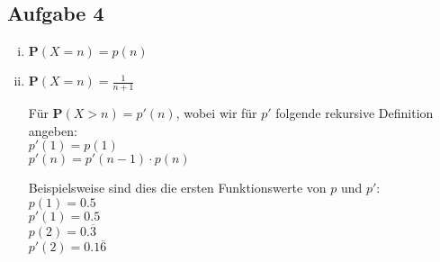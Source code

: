 \documentclass[10pt,a4paper,parskip=half]{scrartcl}
\begin{document}
\subsection*{Aufgabe 4}
\begin{enumerate}[(i)]
\item
$\mathbf P(X = n) = p(n)$
\item
$\mathbf P(X = n) = \frac 1 {n+1}$

Für $\mathbf P(X>n) = p'(n)$, wobei wir für $p'$ folgende rekursive Definition angeben:\\
$p'(1) = p(1)$\\
$p'(n) = p'(n-1) \cdot p(n)$

Beispielsweise sind dies die ersten Funktionswerte von $p$ und $p'$:\\
$p(1) = 0.5$\\
$p'(1) = 0.5$\\
$p(2) = 0.\overline3$\\
$p'(2) = 0.1\overline6$


\end{enumerate}
\end{document}
